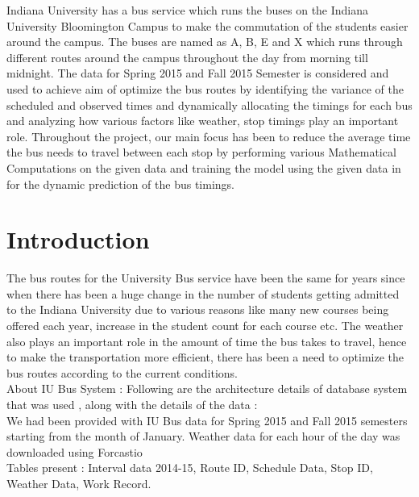 \documentclass[12pt]{article}
\renewenvironment{abstract}
 {\small
  \begin{center}
  \bfseries \abstractname\vspace{-.5em}\vspace{0pt}
  \end{center}
  \list{}{
    \setlength{\leftmargin}{.5cm}%
    \setlength{\rightmargin}{\leftmargin}%
  }%
  \item\relax}
 {\endlist}
\begin{document}
\begin{abstract}
Indiana University has a bus service which runs the buses on the Indiana University Bloomington Campus to make the commutation of the students easier around the campus. The buses are named as A, B, E and X which runs through different routes around the campus throughout the day from morning till midnight. The data for Spring 2015 and Fall 2015 Semester is considered and used to achieve aim of optimize the bus routes by identifying the variance of the scheduled and observed times and dynamically allocating the timings for each bus and analyzing how various factors like weather, stop timings play an important role. Throughout the project, our main focus has been to reduce the average time the bus needs to travel between each stop by performing various Mathematical Computations on the given data and training the model using the given data in for the dynamic prediction of the bus timings. 
\end{abstract}

\clearpage


\clearpage

\section{Introduction}
The bus routes for the University Bus service have been the same for years since when there has been a huge change in the number of students getting admitted to the Indiana University due to various reasons like  many new courses being offered each year, increase in the student count for each course etc. The weather also plays an important role in the amount of time the bus takes to travel, hence to make the transportation more efficient, there has been a need to optimize the bus routes according to the current conditions.   \\

About IU Bus System : Following are the architecture details of database system that was used , along with the details of the data : \\


We had been provided with IU Bus data for Spring 2015 and Fall 2015 semesters starting from the month of January. Weather data for each hour of the day was downloaded using Forcastio  \\

Tables present : Interval data 2014-15, Route ID, Schedule Data, Stop ID, Weather Data, Work Record. \\
\end{document}
